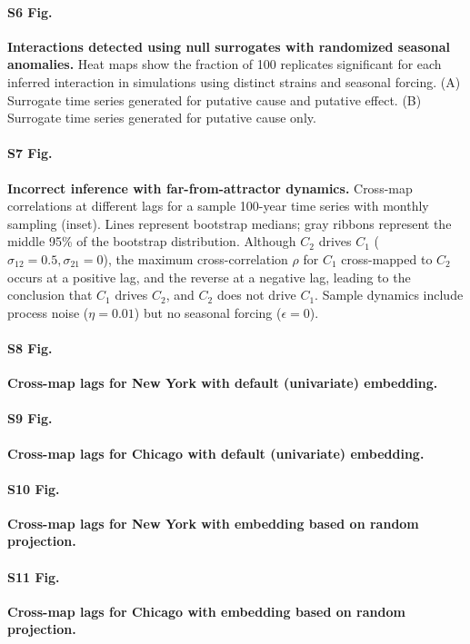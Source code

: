 \documentclass[10pt,letterpaper]{article}
\begin{document}
\paragraph*{S6 Fig.}
\label{fig:surrogates}
{\bf Interactions detected using null surrogates with randomized seasonal anomalies.}
Heat maps show the fraction of 100 replicates significant for each inferred interaction in simulations using distinct strains and seasonal forcing.
(A) Surrogate time series generated for putative cause and putative effect.
(B) Surrogate time series generated for putative cause only.

\paragraph*{S7 Fig.}
\label{fig:transient}
{\bf Incorrect inference with far-from-attractor dynamics.}
Cross-map correlations at different lags for a sample 100-year time series with monthly sampling (inset).
Lines represent bootstrap medians; gray ribbons represent the middle 95\% of the bootstrap distribution.
Although $C_2$ drives $C_1$ ($\sigma_{12}= 0.5, \sigma_{21}=0$), the maximum cross-correlation $\rho$ for $C_1$ cross-mapped to $C_2$ occurs at a positive lag, and the reverse at a negative lag, leading to the conclusion that $C_1$ drives $C_2$, and $C_2$ does not drive $C_1$.
Sample dynamics include process noise ($\eta=0.01$) but no seasonal forcing ($\epsilon=0$).

\paragraph*{S8 Fig.}
\label{fig:cities_corrbylag_nyc_self_uniform}
{\bf Cross-map lags for New York with default (univariate) embedding.}

\paragraph*{S9 Fig.}
\label{fig:cities_corrbylag_chi_self_uniform}
{\bf Cross-map lags for Chicago with default (univariate) embedding.}

\paragraph*{S10 Fig.}
\label{fig:cities_corrbylag_nyc_cross_projection}
{\bf Cross-map lags for New York with embedding based on random projection.}

\paragraph*{S11 Fig.}
\label{fig:cities_corrbylag_chi_cross_projection}
{\bf Cross-map lags for Chicago with embedding based on random projection.}
\end{document}
